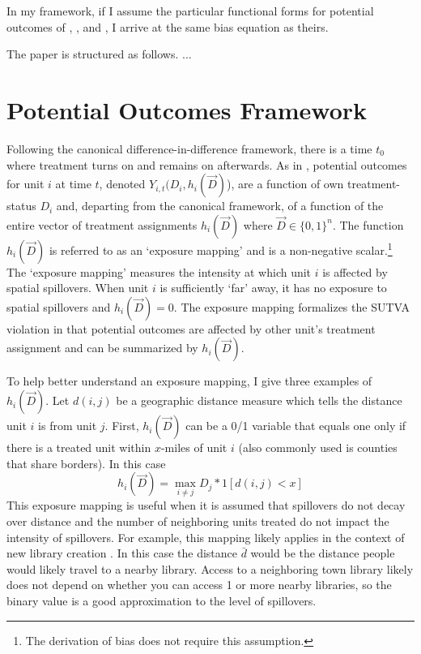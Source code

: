 \documentclass[11pt]{article}
\begin{document}
In my framework, if I assume the particular functional forms for potential outcomes of \citet{Clarke_2017}, \citet{Berg_Streitz_2019}, and \citet{Verbitsky-Savitz_Raudenbush_2012}, I arrive at the same bias equation as theirs. 

The paper is structured as follows. ...









\section{Potential Outcomes Framework}

Following the canonical difference-in-difference framework, there is a time $t_0$ where treatment turns on and remains on afterwards. As in \citet{Vazquez-Bare_2019}, potential outcomes for unit $i$ at time $t$, denoted $Y_{i,t}(D_i, h_i(\vec{D})$), are a function of own treatment-status $D_i$ and,  departing from the canonical framework, of a function of the entire vector of treatment assignments $h_i(\vec{D})$ where $\vec{D} \in \{0,1 \}^n$. The function $h_i(\vec{D})$ is referred to as an `exposure mapping' and is a non-negative scalar.\footnote{The derivation of bias does not require this assumption.} The `exposure mapping' measures the intensity at which unit $i$ is affected by spatial spillovers. When unit $i$ is sufficiently `far' away, it has no exposure to spatial spillovers and $h_i(\vec{D}) = 0$. The exposure mapping formalizes the SUTVA violation in that potential outcomes are affected by other unit's treatment assignment and can be summarized by $h_i(\vec{D})$. 

To help better understand an exposure mapping, I give three examples of $h_i(\vec{D})$. Let $d(i,j)$ be a geographic distance measure which tells the distance unit $i$ is from unit $j$. First, $h_i(\vec{D})$ can be a 0/1 variable that equals one only if there is a treated unit within $x$-miles of unit $i$ (also commonly used is counties that share borders). In this case \[
    h_i(\vec{D}) = \max_{i \neq j} D_j * 1[ d(i,j) < x ] 
\] 
This exposure mapping is useful when it is assumed that spillovers do not decay over distance and the number of neighboring units treated do not impact the intensity of spillovers. For example, this mapping likely applies in the context of new library creation \citep{Berkes_Nencka_2020}. In this case the distance $\bar{d}$ would be the distance people would likely travel to a nearby library. Access to a neighboring town library likely does not depend on whether you can access 1 or more nearby libraries, so the binary value is a good approximation to the level of spillovers.  
\end{document}
